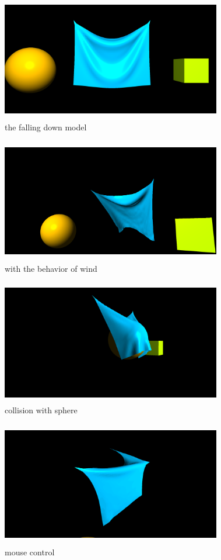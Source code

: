 \documentclass[acmtog]{acmart}
\begin{document}
\begin{figure}[h]
	\centering
	\includegraphics[width=9.6cm,height=5.4cm]{must}
	\caption{the falling down model}
\end{figure}

\begin{figure}[h]
	\centering
	\includegraphics[width=9.6cm,height=5.4cm]{wind}
	\caption{with the behavior of wind}
\end{figure}

\begin{figure}[h]
	\centering
	\includegraphics[width=9.6cm,height=5.4cm]{collision}
	\caption{collision with sphere}
\end{figure}

\begin{figure}[h]
	\centering
	\includegraphics[width=9.6cm,height=5.4cm]{mouse}
	\caption{mouse control}
\end{figure}
\end{document}
